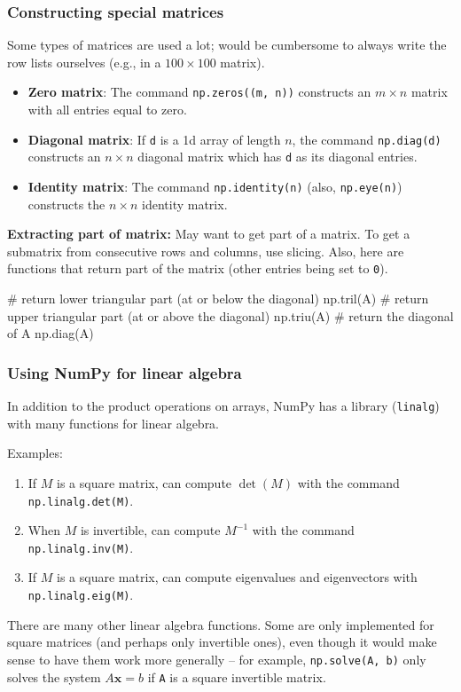 \documentclass{beamer}
\newenvironment{codeblock}
    {\hfill\begin{beamerboxesrounded}[lower=codecol, width=0.8\textwidth]
    \medskip

    }
    { 
    \end{beamerboxesrounded}\hfill
    }
\theoremstyle{example}
\newcommand{\ttt}[1]{{\small\texttt{#1}}}
\begin{document}
\begin{frame}[fragile]
\frametitle{Constructing special matrices}
Some types of matrices are used a lot; would be cumbersome to always write the row lists ourselves (e.g., in a $100\times100$ matrix).
    
    \begin{itemize}
        \item[] \textbf{Zero matrix}: The command \ttt{np.zeros((m, n))} constructs an $m\times n$ matrix with all entries equal to zero.
        \pause
        \item[] \textbf{Diagonal matrix}: If \ttt{d} is a 1d array of length $n$, the command \ttt{np.diag(d)} constructs an $n\times n$ diagonal matrix which has \ttt{d} as its diagonal entries.
        \pause
        \item[] \textbf{Identity matrix}: The command \ttt{np.identity(n)} (also, \ttt{np.eye(n)}) constructs the $n\times n$ identity matrix.
    \end{itemize}
    
\textbf{Extracting part of matrix:} May want to get part of a matrix. To get a submatrix from consecutive rows and columns, use slicing. \pause
Also, here are functions that return part of the matrix (other entries being set to \ttt{0}).%

\begin{codeblock}

\begin{python}
# return lower triangular part (at or below the diagonal)
np.tril(A)
# return upper triangular part (at or above the diagonal)
np.triu(A)
# return the diagonal of A
np.diag(A)
\end{python}

\end{codeblock}
\end{frame}

\begin{frame}
\frametitle{Using NumPy for linear algebra}
In addition to the product operations on arrays, NumPy has a library (\ttt{linalg}) with many functions for linear algebra. 

\pause
Examples: 
\begin{enumerate}
    \item If $M$ is a square matrix, can compute $\det(M)$ with the command \ttt{np.linalg.det(M)}.
    \pause
    \item When $M$ is invertible, can compute $M^{-1}$ with the command \ttt{np.linalg.inv(M)}.
    \pause
    \item If $M$ is a square matrix, can compute eigenvalues and eigenvectors with \ttt{np.linalg.eig(M)}. 
\end{enumerate}

\pause
There are many other linear algebra functions. Some are only implemented for square matrices (and perhaps only invertible ones), even though it would make sense to have them work more generally {--} for example, \ttt{np.solve(A, b)} only solves the system $A\mathbf{x} = b$ if \ttt{A} is a square invertible matrix.
\end{frame}
\end{document}
